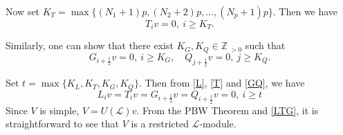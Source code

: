 \documentclass[12pt]{article}
\def\ssc{\scriptscriptstyle}
\def\vs{\vspace*}
\def\Z{\mathbb{Z}{\ssc\,}}
\numberwithin{equation}{section}
\begin{document}
Now set $K_T=\max\{(N_1+1)p,(N_2+2)p, \ldots, (N_p+1)p\}$. Then we have
\begin{equation}\label{T}T_{i}v=0,\ i\ge K_T.
\end{equation}

 Similarly, one can show that there exist  $K_G, K_Q\in\Z_{>0}$ such that
 \begin{equation}\label{GQ}G_{i+\frac{1}{2}}v=0,\ i\ge K_G,\quad Q_{j+\frac{1}{2}}v=0,\ j\ge K_Q.
\end{equation}

Set $t=\max\{K_L,K_T,K_G,K_Q\}$. Then from \eqref{L}, \eqref{T} and \eqref{GQ}, we have
\begin{equation}\label{LTG}L_iv= T_iv=G_{i+\frac{1}{2}}v= Q_{i+\frac{1}{2}}v=0,\ i\ge t
\end{equation} Since $V$ is simple, $V=U(\mathcal{L})v$. From the PBW Theorem and \eqref{LTG}, it is straightforward to  see that  $V$ is a restricted $\mathcal{L}$-module.

 \vs{8pt}
\end{document}
